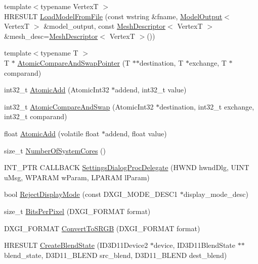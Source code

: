 \begin{DoxyCompactItemize}
\item 
{\footnotesize template$<$typename VertexT $>$ }\\H\+R\+E\+S\+U\+LT \hyperlink{namespacemage_a23fc9688b56289aa280a6cb7541dfbca}{Load\+Model\+From\+File} (const wstring \&fname, \hyperlink{structmage_1_1_model_output}{Model\+Output}$<$ VertexT $>$ \&model\+\_\+output, const \hyperlink{structmage_1_1_mesh_descriptor}{Mesh\+Descriptor}$<$ VertexT $>$ \&mesh\+\_\+desc=\hyperlink{structmage_1_1_mesh_descriptor}{Mesh\+Descriptor}$<$ VertexT $>$())
\item 
{\footnotesize template$<$typename T $>$ }\\T $\ast$ \hyperlink{namespacemage_aed89242e67231f3ddef77bdc63b32b6c}{Atomic\+Compare\+And\+Swap\+Pointer} (T $\ast$$\ast$destination, T $\ast$exchange, T $\ast$comparand)
\item 
int32\+\_\+t \hyperlink{namespacemage_ad397e742fa7e3532686fd46bb50e8166}{Atomic\+Add} (Atomic\+Int32 $\ast$addend, int32\+\_\+t value)
\item 
int32\+\_\+t \hyperlink{namespacemage_a03da57cfa5ba14d4aa0472ae49ec5c7e}{Atomic\+Compare\+And\+Swap} (Atomic\+Int32 $\ast$destination, int32\+\_\+t exchange, int32\+\_\+t comparand)
\item 
float \hyperlink{namespacemage_a0de5ff6241a0474f4572c7c3ba342098}{Atomic\+Add} (volatile float $\ast$addend, float value)
\item 
size\+\_\+t \hyperlink{namespacemage_afe0cda2eaeef24c7e3ee5d7a739b81e4}{Number\+Of\+System\+Cores} ()
\item 
I\+N\+T\+\_\+\+P\+TR C\+A\+L\+L\+B\+A\+CK \hyperlink{namespacemage_a6b352e8d2bf3eeccf1a5dec3f1cf4130}{Settings\+Dialog\+Proc\+Delegate} (H\+W\+ND hwnd\+Dlg, U\+I\+NT u\+Msg, W\+P\+A\+R\+AM w\+Param, L\+P\+A\+R\+AM l\+Param)
\item 
bool \hyperlink{namespacemage_abdccde1f16aa2239019e1b455d8b941b}{Reject\+Display\+Mode} (const D\+X\+G\+I\+\_\+\+M\+O\+D\+E\+\_\+\+D\+E\+S\+C1 $\ast$display\+\_\+mode\+\_\+desc)
\item 
size\+\_\+t \hyperlink{namespacemage_a782fb3970da2fbbc93627f7324c193aa}{Bits\+Per\+Pixel} (D\+X\+G\+I\+\_\+\+F\+O\+R\+M\+AT format)
\item 
D\+X\+G\+I\+\_\+\+F\+O\+R\+M\+AT \hyperlink{namespacemage_a9d84163ab692956f5f4537a965238a09}{Convert\+To\+S\+R\+GB} (D\+X\+G\+I\+\_\+\+F\+O\+R\+M\+AT format)
\item 
H\+R\+E\+S\+U\+LT \hyperlink{namespacemage_ad2c838028ab44521fe1818721dd7ade1}{Create\+Blend\+State} (I\+D3\+D11\+Device2 $\ast$device, I\+D3\+D11\+Blend\+State $\ast$$\ast$blend\+\_\+state, D3\+D11\+\_\+\+B\+L\+E\+ND src\+\_\+blend, D3\+D11\+\_\+\+B\+L\+E\+ND dest\+\_\+blend)

\end{DoxyCompactItemize}
